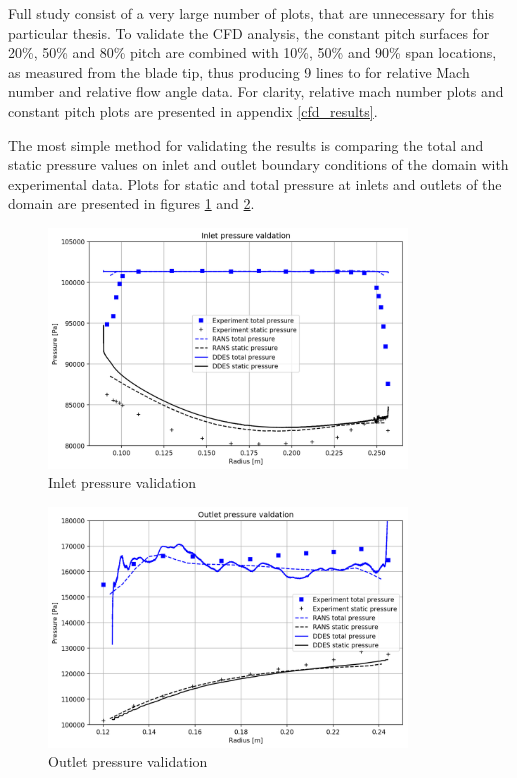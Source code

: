 Full study consist of a very large number of plots, that are unnecessary for this particular thesis. To validate the CFD analysis, the constant pitch surfaces for 20\%, 50\% and 80\% pitch are combined with 10\%, 50\% and 90\% span locations, as measured from the blade tip, thus producing 9 lines to for relative Mach number and relative flow angle data. For clarity, relative mach number plots and constant pitch plots are presented in appendix \ref{cfd_results}. 

The most simple method for validating the results is comparing the total and static pressure values on inlet and outlet boundary conditions of the domain with experimental data. Plots for static and total pressure at inlets and outlets of the domain are presented in figures \ref{pvalid_in} and \ref{pvalid_out}. 

\begin{figure}[h!]
\centering %
\includegraphics[width=0.85\textwidth]{Pictures/pvalid_in.png}
\caption{Inlet pressure validation}
\label{pvalid_in}
\end{figure}

\begin{figure}[h!]
\centering %
\includegraphics[width=0.85\textwidth]{Pictures/pvalid_out.png}
\caption{Outlet pressure validation}
\label{pvalid_out}
\end{figure}


